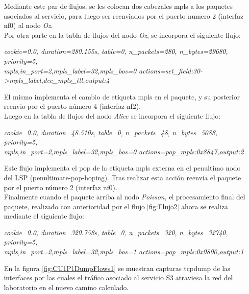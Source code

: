 Mediante este par de flujos, se les colocan dos cabezales mpls a los paquetes asociados al servicio, para luego ser reenviados por el puerto numero 2 (interfaz nf0) al nodo \textit{Oz}.\\

Por otra parte en la tabla de flujos del nodo \textit{Oz}, se incorpora el siguiente flujo:

\begin{center}
\textit{cookie=0.0, duration=280.155s, table=0, n\_packets=280, n\_bytes=29680, priority=5, \\
mpls,in\_port=2,mpls\_label=32,mpls\_bos=0 actions=set\_field:30->mpls\_label,dec\_mpls\_ttl,output:4 }
\end{center}

El mismo implementa el cambio de etiqueta mpls en el paquete, y su posterior reenvio por el puerto n\'umero 4 (interfaz nf2).\\

Luego en la tabla de flujos del nodo \textit{Alice} se incorpora el siguiente flujo:

\begin{center}
\textit{cookie=0.0, duration=48.510s, table=0, n\_packets=48, n\_bytes=5088, priority=5, \\
mpls,in\_port=2,mpls\_label=32,mpls\_bos=0 actions=pop\_mpls:0x8847,output:2 }
\end{center}

Este flujo implementa el pop de la etiqueta mpls externa en el penultimo nodo del LSP (penultimate-pop-hoping). Tras realizar esta acci\'on reenvia el paquete por el puerto n\'umero 2 (interfaz nf0).\\

Finalmente cuando el paquete arriba al nodo \textit{Poisson}, el procesamiento final del paquete, realizado con anterioridad por el flujo \ref{fig:Flujo2} ahora se realiza mediante el siguiente flujo: 

\begin{center}
\textit{cookie=0.0, duration=320.758s, table=0, n\_packets=320, n\_bytes=32740, priority=5, \\
mpls,in\_port=2,mpls\_label=32,mpls\_bos=1 actions=pop\_mpls:0x0800,output:1 }
\end{center}

En la figura \ref{fig:CU1P1DumpFlows1} se muestran capturas tcpdump de las interfaces por las cuales el tr\'afico asociado al servicio S3 atraviesa la red del laboratorio en el nuevo camino calculado.

